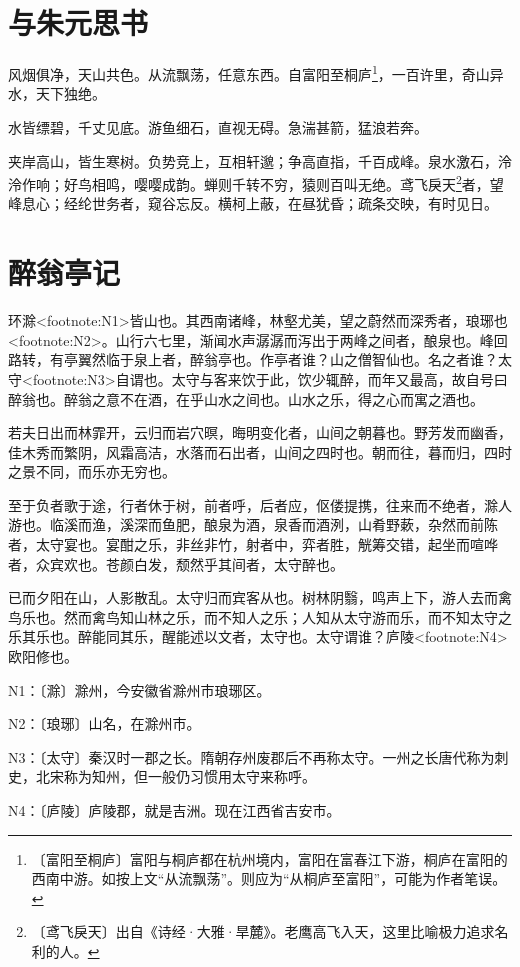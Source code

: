 \documentclass[12pt,UTF-8,openany]{ctexbook}
\begin{document}
\chapter{与朱元思书}

\begin{normalsize}
    
    风烟俱净，天山共色。从流飘荡，任意东西。自富阳至桐庐\footnote{〔富阳至桐庐〕富阳与桐庐都在杭州境内，富阳在富春江下游，桐庐在富阳的西南中游。如按上文“从流飘荡”。则应为“从桐庐至富阳”，可能为作者笔误。}，一百许里，奇山异水，天下独绝。
    
    水皆缥碧，千丈见底。游鱼细石，直视无碍。急湍甚箭，猛浪若奔。
    
    夹岸高山，皆生寒树。负势竞上，互相轩邈；争高直指，千百成峰。泉水激石，泠泠作响；好鸟相鸣，嘤嘤成韵。蝉则千转不穷，猿则百叫无绝。鸢飞戾天\footnote{〔鸢飞戾天〕出自《诗经·大雅·旱麓》。老鹰高飞入天，这里比喻极力追求名利的人。}者，望峰息心；经纶世务者，窥谷忘反。横柯上蔽，在昼犹昏；疏条交映，有时见日。
\end{normalsize}



\chapter{醉翁亭记}

\begin{normalsize}
    
    环滁<footnote:N1>皆山也。其西南诸峰，林壑尤美，望之蔚然而深秀者，琅琊也<footnote:N2>。山行六七里，渐闻水声潺潺而泻出于两峰之间者，酿泉也。峰回路转，有亭翼然临于泉上者，醉翁亭也。作亭者谁？山之僧智仙也。名之者谁？太守<footnote:N3>自谓也。太守与客来饮于此，饮少辄醉，而年又最高，故自号曰醉翁也。醉翁之意不在酒，在乎山水之间也。山水之乐，得之心而寓之酒也。
    
    若夫日出而林霏开，云归而岩穴暝，晦明变化者，山间之朝暮也。野芳发而幽香，佳木秀而繁阴，风霜高洁，水落而石出者，山间之四时也。朝而往，暮而归，四时之景不同，而乐亦无穷也。
    
    至于负者歌于途，行者休于树，前者呼，后者应，伛偻提携，往来而不绝者，滁人游也。临溪而渔，溪深而鱼肥，酿泉为酒，泉香而酒洌，山肴野蔌，杂然而前陈者，太守宴也。宴酣之乐，非丝非竹，射者中，弈者胜，觥筹交错，起坐而喧哗者，众宾欢也。苍颜白发，颓然乎其间者，太守醉也。
    
    已而夕阳在山，人影散乱。太守归而宾客从也。树林阴翳，鸣声上下，游人去而禽鸟乐也。然而禽鸟知山林之乐，而不知人之乐；人知从太守游而乐，而不知太守之乐其乐也。醉能同其乐，醒能述以文者，太守也。太守谓谁？庐陵<footnote:N4>欧阳修也。
    
    N1：〔滁〕滁州，今安徽省滁州市琅琊区。
    
    N2：〔琅琊〕山名，在滁州市。
    
    N3：〔太守〕秦汉时一郡之长。隋朝存州废郡后不再称太守。一州之长唐代称为刺史，北宋称为知州，但一般仍习惯用太守来称呼。
    
    N4：〔庐陵〕庐陵郡，就是吉洲。现在江西省吉安市。
\end{normalsize}
\end{document}
